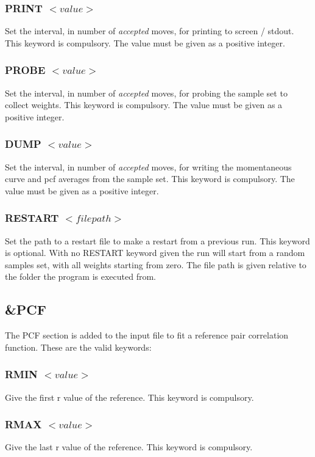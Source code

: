 \documentclass[a4paper, 10pt]{article}
\begin{document}
\subsubsection{PRINT $<value>$}
Set the interval, in number of {\it accepted} moves, for printing to screen / stdout.
This keyword is compulsory. The value must be given as a positive integer.

\subsubsection{PROBE $<value>$}
Set the interval, in number of {\it accepted} moves, for probing the sample
set to collect weights. This keyword is compulsory. The value must be given as a positive integer.

\subsubsection{DUMP $<value>$}
Set the interval, in number of {\it accepted} moves, for writing the
momentaneous curve and pcf averages
from the sample set. This keyword is compulsory.
 The value must be given as a positive integer.

\subsubsection{RESTART $<file path>$}
Set the path to a restart file to make a restart from a previous
run. This keyword is optional. With no RESTART keyword given the run
will start from a random samples set, with all weights starting from
zero. The file path is given relative to the folder the program is
executed from.

\subsection{\&PCF}
The PCF section is added to the input file to fit a reference
pair correlation function. These are the valid keywords:

\subsubsection{RMIN $<value>$}
Give the first r value of the reference. This keyword is compulsory.

\subsubsection{RMAX $<value>$}
Give the last r value of the reference. This keyword is compulsory.
\end{document}
